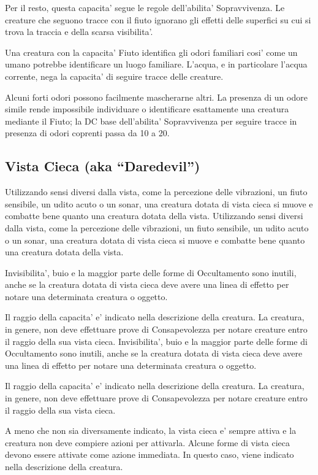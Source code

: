 \documentclass[a4paper,11pt,twoside,openany]{book}
\begin{document}
Per il resto, questa capacita' segue le regole dell'abilita' Sopravvivenza. Le creature che seguono tracce con il fiuto ignorano gli effetti delle superfici su cui si trova la traccia e della scarsa visibilita'.

Una creatura con la capacita' Fiuto identifica gli odori familiari cosi' come un umano potrebbe identificare un luogo familiare. L'acqua, e in particolare l'acqua corrente, nega la capacita' di seguire tracce delle creature.

Alcuni forti odori possono facilmente mascherarne altri. La presenza di un odore simile rende impossibile individuare o identificare esattamente una creatura mediante il Fiuto; la DC base dell'abilita' Sopravvivenza per seguire tracce in presenza di odori coprenti passa da 10 a 20.


\subsection{Vista Cieca (aka “Daredevil”)}

Utilizzando sensi diversi dalla vista, come la percezione delle vibrazioni, un fiuto sensibile, un udito acuto o un sonar, una creatura dotata di vista cieca si muove e combatte bene quanto una creatura dotata della vista. 
Utilizzando sensi diversi dalla vista, come la percezione delle vibrazioni, un fiuto sensibile, un udito acuto o un sonar, una creatura dotata di vista cieca si muove e combatte bene quanto una creatura dotata della vista. 

Invisibilita’, buio e la maggior parte delle forme di Occultamento sono inutili, anche se la creatura dotata di vista cieca deve avere una linea di effetto per notare una determinata creatura o oggetto. 

Il raggio della capacita' e' indicato nella descrizione della creatura. La creatura, in genere, non deve effettuare prove di Consapevolezza per notare creature entro il raggio della sua vista cieca.
Invisibilita’, buio e la maggior parte delle forme di Occultamento sono inutili, anche se la creatura dotata di vista cieca deve avere una linea di effetto per notare una determinata creatura o oggetto. 

Il raggio della capacita' e' indicato nella descrizione della creatura. La creatura, in genere, non deve effettuare prove di Consapevolezza per notare creature entro il raggio della sua vista cieca.

A meno che non sia diversamente indicato, la vista cieca e' sempre attiva e la creatura non deve compiere azioni per attivarla. Alcune forme di vista cieca devono essere attivate come azione immediata. In questo caso, viene indicato nella descrizione della creatura.
\end{document}
